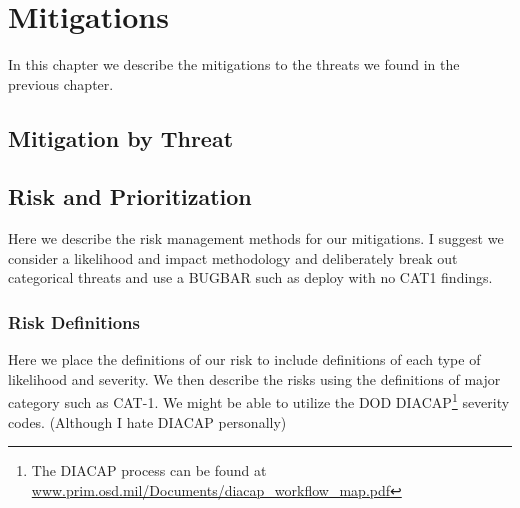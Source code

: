\chapter{Mitigations}
\label{ch:mitigations}
In this chapter we describe the mitigations to the threats we found in
the previous chapter.

\section{Mitigation by Threat}

\section{Risk and Prioritization}
\label{sec:risk}
Here we describe the risk management methods for our mitigations. I
suggest we consider a likelihood and impact methodology and
deliberately break out categorical threats and use a BUGBAR such as
deploy with no CAT1 findings.

\subsection{Risk Definitions}
Here we place the definitions of our risk to include definitions of
each type of likelihood and severity.  We then describe the risks
using the definitions of major category such as CAT-1.  We might be
able to utilize the DOD DIACAP\footnote{The DIACAP process can be
found at \url{www.prim.osd.mil/Documents/diacap_workflow_map.pdf}}
severity codes.  (Although I hate DIACAP personally)
